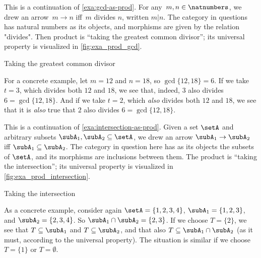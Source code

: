 \begin{example}
    \label{exa:gcd-as-prod-cont}
    This is a continuation of \cref{exa:gcd-as-prod}.
    For any~$m, n \in \natnumbers$, we drew an arrow~$m \to n$ iff~$m$ divides $n$, written $m | n$.
    The category in questions has natural numbers as its objects, and morphisms are given by the relation "divides".
    Then product is ``taking the greatest common divisor''; its universal property is visualized in \cref{fig:exa_prod_gcd}.
    \begin{marginfigure}
        \centering
        \caption{Taking the greatest common divisor}
        \label{fig:exa_prod_gcd_cont}
    \end{marginfigure}
    For a concrete example, let $m = 12$ and $n = 18$, so $\gcd \{12, 18 \} = 6$.
    If we take $t = 3$, which divides both $12$ and $18$, we see that, indeed, $3$ also divides $6 = \gcd \{12, 18 \}$.
    And if we take $t = 2$, which \emph{also} divides both $12$ and $18$, we see that it is \emph{also} true that $2$ also divides $6 = \gcd \{12, 18 \}$.
\end{example}

\begin{example}
    \label{exa:intersection-as-prod-cont}
    This is a continuation of \cref{exa:intersection-as-prod}.
    Given a set $\setA$ and arbitrary subsets $\subA_1, \subA_2 \subseteq \setA$, we drew an arrow $\subA_1 \to \subA_2$ iff $\subA_1 \subseteq \subA_2$.
    The category in question here has as its objects the subsets of $\setA$, and its morphisms are inclusions between them.
    The product is ``taking the intersection''; its universal property is visualized in \cref{fig:exa_prod_intersection}.
    \begin{marginfigure}
        \centering
        \caption{Taking the intersection}
        \label{fig:exa_prod_intersection_cont}
    \end{marginfigure}
    As a concrete example, consider again $\setA = \{ 1, 2, 3, 4 \}$, $\subA_1 = \{ 1, 2, 3 \}$, and $\subA_2 = \{2, 3, 4 \}$.
    So $\subA_1 \cap \subA_2 = \{2, 3 \}$.
    If we choose $T = \{ 2 \}$, we see that $T \subseteq \subA_1$ and $T \subseteq \subA_2$, and that also $T \subseteq \subA_1 \cap \subA_2$ (as it must, according to the universal property).
    The situation is similar if we choose $T = \{ 1\}$ or $T = \emptyset$.
\end{example}

